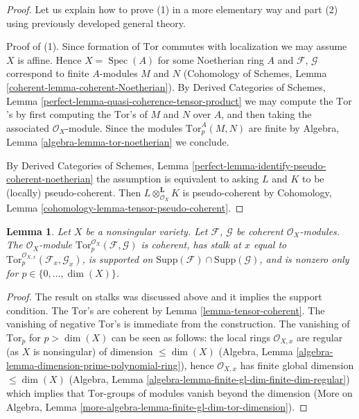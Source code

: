 \documentclass{stacks-project}
\theoremstyle{plain}
\newtheorem{lemma}[subsection]{Lemma}
\theoremstyle{definition}
\theoremstyle{remark}
\numberwithin{equation}{subsection}
\def\Spec{\mathop{\mathrm{Spec}}}
\begin{document}
\begin{proof}
Let us explain how to prove (1) in a more elementary way and part (2)
using previously developed general theory.

\medskip\noindent
Proof of (1). Since formation of $\text{Tor}$ commutes with localization
we may assume $X$ is affine. Hence $X = \Spec(A)$ for some Noetherian
ring $A$ and $\mathcal{F}$, $\mathcal{G}$ correspond to finite $A$-modules
$M$ and $N$ (Cohomology of Schemes, Lemma
\ref{coherent-lemma-coherent-Noetherian}).
By Derived Categories of Schemes, Lemma
\ref{perfect-lemma-quasi-coherence-tensor-product} we may
compute the $\text{Tor}$'s by first computing the $\text{Tor}$'s
of $M$ and $N$ over $A$, and then taking the associated $\mathcal{O}_X$-module.
Since the modules $\text{Tor}_p^A(M, N)$ are finite by
Algebra, Lemma \ref{algebra-lemma-tor-noetherian}
we conclude.

\medskip\noindent
By Derived Categories of Schemes, Lemma
\ref{perfect-lemma-identify-pseudo-coherent-noetherian}
the assumption is equivalent to asking $L$ and $K$ to be
(locally) pseudo-coherent. Then $L \otimes_{\mathcal{O}_X}^\mathbf{L} K$
is pseudo-coherent by
Cohomology, Lemma \ref{cohomology-lemma-tensor-pseudo-coherent}.
\end{proof}

\begin{lemma}
\label{lemma-compute-tor-nonsingular}
Let $X$ be a nonsingular variety.
Let $\mathcal{F}$, $\mathcal{G}$ be coherent $\mathcal{O}_X$-modules.
The $\mathcal{O}_X$-module
$\text{Tor}_p^{\mathcal{O}_X}(\mathcal{F}, \mathcal{G})$
is coherent, has stalk at $x$ equal to
$\text{Tor}_p^{\mathcal{O}_{X, x}}(\mathcal{F}_x, \mathcal{G}_x)$,
is supported on
$\text{Supp}(\mathcal{F}) \cap \text{Supp}(\mathcal{G})$, and
is nonzero only for $p \in \{0, \ldots, \dim(X)\}$.
\end{lemma}

\begin{proof}
The result on stalks was discussed above and it implies the support
condition. The $\text{Tor}$'s are coherent by
Lemma \ref{lemma-tensor-coherent}. The vanishing of negative
$\text{Tor}$'s is immediate from the construction. The
vanishing of $\text{Tor}_p$ for $p > \dim(X)$ can be seen as follows:
the local rings $\mathcal{O}_{X, x}$ are regular
(as $X$ is nonsingular) of dimension $\leq \dim(X)$
(Algebra, Lemma \ref{algebra-lemma-dimension-prime-polynomial-ring}),
hence $\mathcal{O}_{X, x}$ has finite global dimension $\leq \dim(X)$
(Algebra, Lemma \ref{algebra-lemma-finite-gl-dim-finite-dim-regular})
which implies that $\text{Tor}$-groups of modules vanish beyond the dimension
(More on Algebra, Lemma \ref{more-algebra-lemma-finite-gl-dim-tor-dimension}).
\end{proof}
\end{document}
